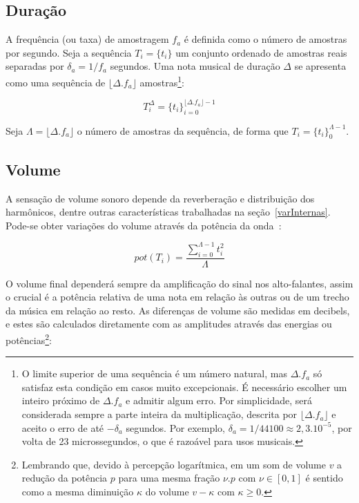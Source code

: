 \subsection{Duração}
A frequência (ou taxa) de amostragem $f_a$ 
é definida como o número de amostras por segundo. Seja
a sequência $T_i=\{t_i\}$ um conjunto ordenado de amostras reais separadas por $\delta_a=1/f_a$ segundos.
Uma nota musical de duração $\Delta$
se apresenta como uma sequência de $ \lfloor \Delta . f_a \rfloor $ amostras\footnote{O
limite superior de uma sequência é um número natural, mas $ \Delta . f_a $
só satisfaz esta condição em casos muito excepcionais. É necessário
escolher um inteiro próximo de $\Delta . f_a$ e admitir algum erro. Por simplicidade, será considerada sempre a parte inteira da multiplicação, descrita por $\lfloor \Delta . f_a \rfloor$ e aceito o erro de até $-\delta_a$ segundos. Por exemplo, $\delta_a=1/44100 \approx 2,3.10^{-5}$, por volta de 23 microssegundos, o que é razoável para usos musicais.}:

\begin{equation}\label{eq:dur}
T_{i}^{\Delta}={\{t_i\}}_{i=0}^{\lfloor \Delta . f_a \rfloor -1}
\end{equation}

Seja $\Lambda = \lfloor \Delta . f_a \rfloor$ o número de amostras da sequência, de forma que $T_i=\{t_i\}_0^{\Lambda-1}$.

\subsection{Volume}
A sensação de volume sonoro depende da reverberação e distribuição dos harmônicos, dentre outras características trabalhadas na seção~\ref{varInternas}. Pode-se obter variações do volume através da potência da onda~\cite{Chowning}:

\begin{equation}\label{eq:potencia}
pot(T_i)=\frac{\sum_{i=0}^{\Lambda -1} t_i^2}{\Lambda}
\end{equation} 

O volume final dependerá sempre da amplificação do sinal nos alto-falantes, assim o crucial é a potência relativa de uma nota em relação às outras ou de um trecho da música em relação ao resto. As diferenças de volume são medidas em decibels, e estes são
calculados diretamente com as amplitudes através das energias ou potências\footnote{Lembrando que, devido à percepção logarítmica,
em um som de volume $v$ a redução da potência $p$ para uma mesma fração $\nu . p $ 
com $\nu \in [0,1]$ é sentido como a mesma diminuição $\kappa$ do volume $v-\kappa$ com $\kappa \geq 0$.}:

